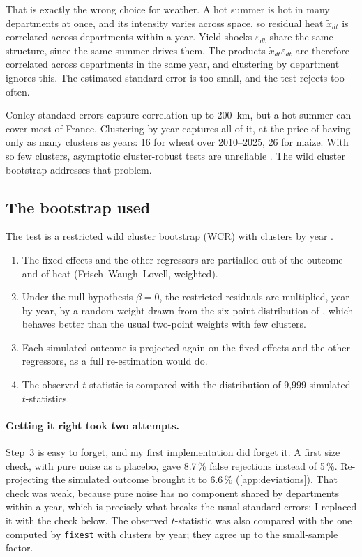 That is exactly the wrong choice for weather. A hot summer is hot in many departments at once, and its intensity varies across space, so residual heat $\tilde x_{dt}$ is correlated across departments within a year. Yield shocks $\varepsilon_{dt}$ share the same structure, since the same summer drives them. The products $\tilde x_{dt}\varepsilon_{dt}$ are therefore correlated across departments in the same year, and clustering by department ignores this. The estimated standard error is too small, and the test rejects too often.

Conley standard errors capture correlation up to 200~km, but a hot summer can cover most of France. Clustering by year captures all of it, at the price of having only as many clusters as years: 16 for wheat over 2010--2025, 26 for maize. With so few clusters, asymptotic cluster-robust tests are unreliable \parencite{cameron2008}. The wild cluster bootstrap addresses that problem.

\subsection{The bootstrap used}

The test is a restricted wild cluster bootstrap (WCR) with clusters by year \parencite{cameron2008}.
\begin{enumerate}
  \item The fixed effects and the other regressors are partialled out of the outcome and of heat (Frisch--Waugh--Lovell, weighted).
  \item Under the null hypothesis $\beta = 0$, the restricted residuals are multiplied, year by year, by a random weight drawn from the six-point distribution of \textcite{webb2023}, which behaves better than the usual two-point weights with few clusters.
  \item Each simulated outcome is projected again on the fixed effects and the other regressors, as a full re-estimation would do.
  \item The observed $t$-statistic is compared with the distribution of 9,999 simulated $t$-statistics.
\end{enumerate}

\paragraph{Getting it right took two attempts.} Step~3 is easy to forget, and my first implementation did forget it. A first size check, with pure noise as a placebo, gave 8.7\,\% false rejections instead of 5\,\%. Re-projecting the simulated outcome brought it to 6.6\,\% (\cref{app:deviations}). That check was weak, because pure noise has no component shared by departments within a year, which is precisely what breaks the usual standard errors; I replaced it with the check below. The observed $t$-statistic was also compared with the one computed by \texttt{fixest} with clusters by year; they agree up to the small-sample factor.


